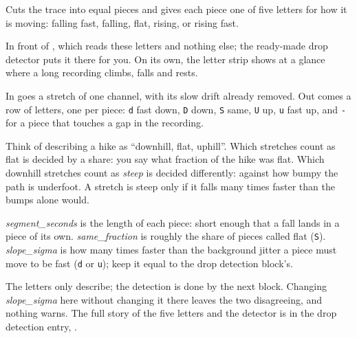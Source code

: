 Cuts the trace into equal pieces and gives each piece one of five letters for how it is
moving: falling fast, falling, flat, rising, or rising fast.

In front of , which reads these letters and nothing
else; the ready-made drop detector puts it there for you. On its own, the letter strip shows
at a glance where a long recording climbs, falls and rests.

In goes a stretch of one channel, with its slow drift already removed. Out comes a row of
letters, one per piece: \texttt{d} fast down, \texttt{D} down, \texttt{S} same, \texttt{U} up,
\texttt{u} fast up, and \texttt{-} for a piece that touches a gap in the recording.

\begin{plainterms}
Think of describing a hike as ``downhill, flat, uphill''. Which stretches count as flat is
decided by a share: you say what fraction of the hike was flat. Which downhill stretches
count as \emph{steep} is decided differently: against how bumpy the path is underfoot. A
stretch is steep only if it falls many times faster than the bumps alone would.
\end{plainterms}

\emph{segment\_seconds} is the length of each piece: short enough that a fall lands in a piece
of its own. \emph{same\_fraction} is roughly the share of pieces called flat (\texttt{S}).
\emph{slope\_sigma} is how many times faster than the background jitter a piece must move to
be fast (\texttt{d} or \texttt{u}); keep it equal to the drop detection block's.

The letters only describe; the detection is done by the next block. Changing
\emph{slope\_sigma} here without changing it there leaves the two disagreeing, and nothing
warns. The full story of the five letters and the detector is in the drop detection entry,
.
